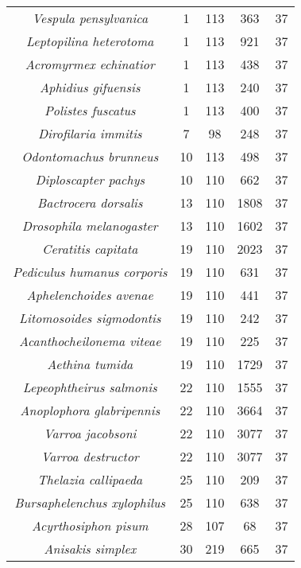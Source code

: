 \begin{longtable}[c]{|c|c|c|c|c|}
\textit{Vespula pensylvanica}             & 1    & 113 & 363  & 37 \\
\textit{Leptopilina heterotoma}           & 1    & 113 & 921  & 37 \\
\textit{Acromyrmex echinatior}            & 1    & 113 & 438  & 37 \\
\textit{Aphidius gifuensis}               & 1    & 113 & 240  & 37 \\
\textit{Polistes fuscatus}                & 1    & 113 & 400  & 37 \\
\textit{Dirofilaria immitis}              & 7    & 98  & 248  & 37 \\
\textit{Odontomachus brunneus}            & 10   & 113 & 498  & 37 \\
\textit{Diploscapter pachys}              & 10   & 110 & 662  & 37 \\
\textit{Bactrocera dorsalis}              & 13   & 110 & 1808 & 37 \\
\textit{Drosophila melanogaster}          & 13   & 110 & 1602 & 37 \\
\textit{Ceratitis capitata}               & 19   & 110 & 2023 & 37 \\
\textit{Pediculus humanus corporis}       & 19   & 110 & 631  & 37 \\
\textit{Aphelenchoides avenae}            & 19   & 110 & 441  & 37 \\
\textit{Litomosoides sigmodontis}         & 19   & 110 & 242  & 37 \\
\textit{Acanthocheilonema viteae}         & 19   & 110 & 225  & 37 \\
\textit{Aethina tumida}                   & 19   & 110 & 1729 & 37 \\
\textit{Lepeophtheirus salmonis}          & 22   & 110 & 1555 & 37 \\
\textit{Anoplophora glabripennis}         & 22   & 110 & 3664 & 37 \\
\textit{Varroa jacobsoni}                 & 22   & 110 & 3077 & 37 \\
\textit{Varroa destructor}                & 22   & 110 & 3077 & 37 \\
\textit{Thelazia callipaeda}              & 25   & 110 & 209  & 37 \\
\textit{Bursaphelenchus xylophilus}       & 25   & 110 & 638  & 37 \\
\textit{Acyrthosiphon pisum}              & 28   & 107 & 68   & 37 \\
\textit{Anisakis simplex}                 & 30   & 219 & 665  & 37 \\

\end{longtable}
